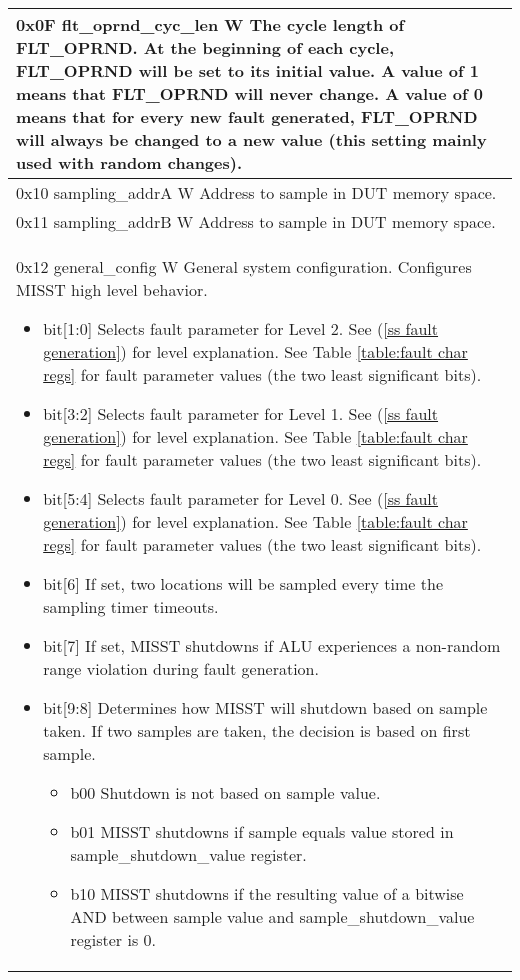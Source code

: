 \documentclass[]{report}
\begin{document}
\begin{center}
\begin{longtable}{| p{\linewidth} |}
		\hline 
		0x0F flt\_oprnd\_cyc\_len W \newline
		The cycle length of FLT\_OPRND. At the beginning of each cycle, FLT\_OPRND will be set to its initial value. A value of 1 means that FLT\_OPRND will never change. A value of 0 means that for every new fault generated, FLT\_OPRND will always be changed to a new value (this setting mainly used with random changes).\\
		\hline
		0x10 sampling\_addrA W \newline
		Address to sample in DUT memory space. \\
		\hline
		0x11 sampling\_addrB W \newline
		Address to sample in DUT memory space. \\
		\hline
		0x12 general\_config W \newline
		General system configuration. Configures MISST high level behavior.
		\begin{itemize}
			\item bit[1:0] Selects fault parameter for Level 2. See (\ref{ss fault generation}) for level explanation. See Table \ref{table:fault char regs} for fault parameter values (the two least significant bits). 
			\item bit[3:2] Selects fault parameter for Level 1. See (\ref{ss fault generation}) for level explanation. See Table \ref{table:fault char regs} for fault parameter values (the two least significant bits).
			\item bit[5:4] Selects fault parameter for Level 0. See (\ref{ss fault generation}) for level explanation. See Table \ref{table:fault char regs} for fault parameter values (the two least significant bits).
			\item bit[6] If set, two locations will be sampled every time the sampling timer timeouts.
			\item bit[7] If set, MISST shutdowns if ALU experiences a non-random range violation during fault generation.
			\item bit[9:8] Determines how MISST will shutdown based on sample taken. If two samples are taken, the decision is based on first sample.
			\begin{itemize}
				\item b00 Shutdown is not based on sample value. 
				\item b01 MISST shutdowns if sample equals value stored in sample\_shutdown\_value register.  
				\item b10 MISST shutdowns if the resulting value of a bitwise AND between sample value and sample\_shutdown\_value register is 0. 

\end{itemize}
\end{itemize}
\end{longtable}
\end{center}
\end{document}
